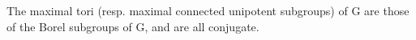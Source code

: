 The maximal tori (resp. maximal connected unipotent subgroups) of G are those of the Borel subgroups of G, and are all conjugate.
